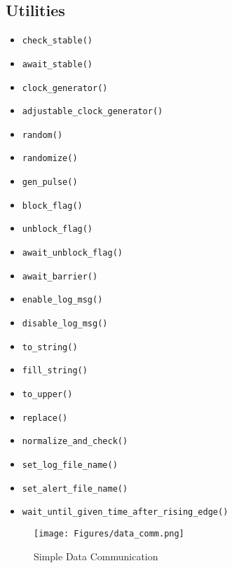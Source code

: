 \documentclass{article}
\begin{document}
\subsection{Utilities}
\begin{itemize}
    \item \texttt{check\_stable()}
    \item \texttt{await\_stable()}
    \item \texttt{clock\_generator()}
    \item \texttt{adjustable\_clock\_generator()}
    \item \texttt{random()}
    \item \texttt{randomize()}
    \item \texttt{gen\_pulse()}
    \item \texttt{block\_flag()}
    \item \texttt{unblock\_flag()}
    \item \texttt{await\_unblock\_flag()}
    \item \texttt{await\_barrier()}
    \item \texttt{enable\_log\_msg()}
    \item \texttt{disable\_log\_msg()}
    \item \texttt{to\_string()}
    \item \texttt{fill\_string()}
    \item \texttt{to\_upper()}
    \item \texttt{replace()}
    \item \texttt{normalize\_and\_check()}
    \item \texttt{set\_log\_file\_name()}
    \item \texttt{set\_alert\_file\_name()}
    \item \texttt{wait\_until\_given\_time\_after\_rising\_edge()}
\end{itemize}

\begin{figure}
    \centering
    \texttt{[image: Figures/data\_comm.png]}
    \caption{Simple Data Communication}
    \label{fig:enter-label}
\end{figure}
\end{document}
